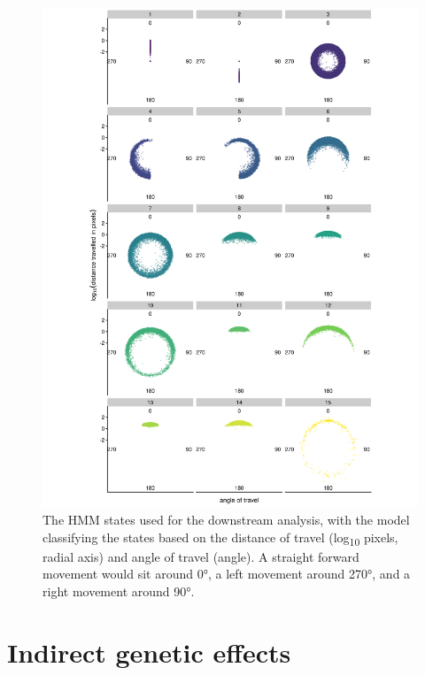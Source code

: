 \documentclass[
]{book}
\begin{document}
\begin{figure}
\includegraphics[width=1\linewidth]{figs/mikk_behaviour/0.08_15_polar_all_dge} \caption{The HMM states used for the downstream analysis, with the model classifying the states based on the distance of travel (log\textsubscript{10} pixels, radial axis) and angle of travel (angle). A straight forward movement would sit around 0°, a left movement around 270°, and a right movement around 90°.}\label{fig:mikk-hmm-sym}
\end{figure}

\clearpage

\hypertarget{indirect-genetic-effects}{%
\section{Indirect genetic effects}\label{indirect-genetic-effects}}
\end{document}
